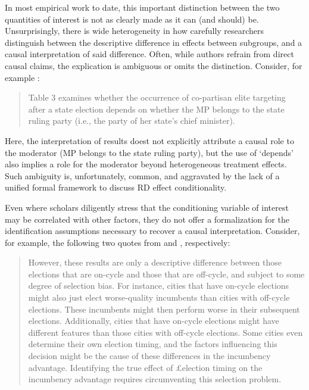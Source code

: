 \documentclass[12pt]{article}
\begin{document}
In most empirical work to date, this important distinction between the two quantities of interest is not as clearly made as it can (and should) be. Unsurprisingly, there is wide heterogeneity in how carefully researchers distinguish between the descriptive difference in effects between subgroups, and a causal interpretation of said difference. Often, while authors refrain from direct causal claims, the explication is ambiguous or omits the distinction. Consider, for example \citet{bohlken2018}:

\begin{quote}
  Table 3 examines whether the occurrence of co-partisan elite targeting after a state election depends on whether the MP belongs to the state ruling party (i.e., the party of her state's chief minister). 
 \end{quote}

Here, the interpretation of results doest not explicitly attribute a causal role to the moderator (MP belongs to the state ruling party), but the use of `depends' also implies a role for the moderator beyond heterogeneous treatment effects. Such ambiguity is, unfortunately, common, and aggravated by the lack of a unified formal framework to discuss RD effect conditionality.

Even where scholars diligently stress that the conditioning variable of interest may be correlated with other factors, they do not offer a formalization for the identification assumptions necessary to recover a causal interpretation. Consider, for example, the following two quotes from \citet{de2018} and \citet{wasserman2018}, respectively:


\begin{quote}
  However, these results are only a descriptive difference between those elections that are on-cycle and those that are off-cycle, and subject to some degree of selection bias. For instance, cities that have on-cycle elections might also just elect worse-quality incumbents than cities with off-cycle elections. These incumbents might then perform worse in their subsequent elections. Additionally, cities that have on-cycle elections might have different features than those cities with off-cycle elections. Some cities even determine their own election timing, and the factors influencing this decision might be the cause of these differences in the incumbency advantage. Identifying the true effect of £election timing on the incumbency advantage requires circumventing this selection problem.
\end{quote}
\end{document}
